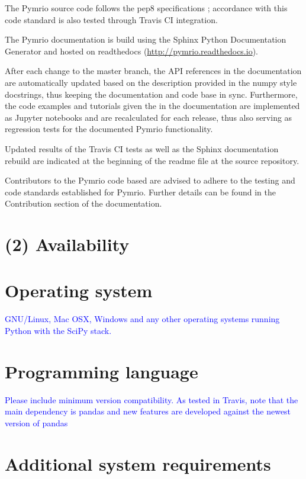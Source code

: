 \documentclass{jors}
\begin{document}
{The Pymrio source code follows the pep8 specifications \cite{rossuml2017}; accordance with this code standard is also tested through Travis CI integration.

The Pymrio documentation is build using the Sphinx Python Documentation Generator \cite{brandl2018} and hosted on readthedocs (\url{http://pymrio.readthedocs.io}).

After each change to the master branch, the API references in the documentation are automatically updated based on the description provided in the numpy style docstrings, thus keeping the documentation and code base in sync.
Furthermore, the code examples and tutorials given the in the documentation are implemented as Jupyter notebooks \cite{kluyver2016} and are recalculated for each release, thus also serving as regression tests for the documented Pymrio functionality.

Updated results of the Travis CI tests as well as the Sphinx documentation rebuild are indicated at the beginning of the readme file at the source repository. 

Contributors to the Pymrio code based are advised to adhere to the testing and code standards established for Pymrio. Further details can be found in the Contribution section of the documentation. 

\section*{(2) Availability}
\vspace{0.5cm}
\section*{Operating system}

\textcolor{blue}{GNU/Linux, Mac OSX, Windows and any other operating systems running Python with the SciPy stack.}

\section*{Programming language}

\textcolor{blue}{Please include minimum version compatibility.
As tested in Travis, note that the main dependency is pandas and new features are developed against the newest version of pandas
}

\section*{Additional system requirements}

}
\end{document}
